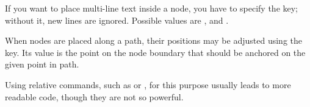 If you want to place multi-line text inside a node, you have to specify the
 key; without it, new lines are ignored. Possible values
are ,  and .
\begin{example}
\end{example}

When nodes are placed along a path, their positions may be adjusted using the
 key. Its value is the point on the node boundary that should be
anchored on the given point in path.
\begin{example}
\end{example}
Using relative commands, such as  or , for this
purpose usually leads to more readable code, though they are not so powerful.
\begin{example}
\end{example}

